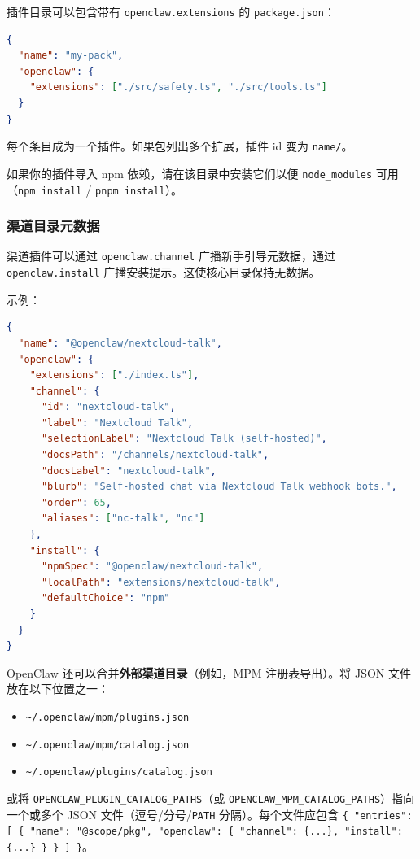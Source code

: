 插件目录可以包含带有 \texttt{openclaw.extensions} 的 \texttt{package.json}：

\begin{lstlisting}[language=json]
{
  "name": "my-pack",
  "openclaw": {
    "extensions": ["./src/safety.ts", "./src/tools.ts"]
  }
}
\end{lstlisting}


每个条目成为一个插件。如果包列出多个扩展，插件 id 变为 \texttt{name/}。

如果你的插件导入 npm 依赖，请在该目录中安装它们以便 \texttt{node\_modules} 可用（\texttt{npm install} / \texttt{pnpm install}）。

\subsubsection{渠道目录元数据}


渠道插件可以通过 \texttt{openclaw.channel} 广播新手引导元数据，通过 \texttt{openclaw.install} 广播安装提示。这使核心目录保持无数据。

示例：

\begin{lstlisting}[language=json]
{
  "name": "@openclaw/nextcloud-talk",
  "openclaw": {
    "extensions": ["./index.ts"],
    "channel": {
      "id": "nextcloud-talk",
      "label": "Nextcloud Talk",
      "selectionLabel": "Nextcloud Talk (self-hosted)",
      "docsPath": "/channels/nextcloud-talk",
      "docsLabel": "nextcloud-talk",
      "blurb": "Self-hosted chat via Nextcloud Talk webhook bots.",
      "order": 65,
      "aliases": ["nc-talk", "nc"]
    },
    "install": {
      "npmSpec": "@openclaw/nextcloud-talk",
      "localPath": "extensions/nextcloud-talk",
      "defaultChoice": "npm"
    }
  }
}
\end{lstlisting}


OpenClaw 还可以合并\textbf{外部渠道目录}（例如，MPM 注册表导出）。将 JSON 文件放在以下位置之一：

\begin{itemize}
  \item \texttt{\textasciitilde{}/.openclaw/mpm/plugins.json}
  \item \texttt{\textasciitilde{}/.openclaw/mpm/catalog.json}
  \item \texttt{\textasciitilde{}/.openclaw/plugins/catalog.json}
\end{itemize}


或将 \texttt{OPENCLAW\_PLUGIN\_CATALOG\_PATHS}（或 \texttt{OPENCLAW\_MPM\_CATALOG\_PATHS}）指向一个或多个 JSON 文件（逗号/分号/\texttt{PATH} 分隔）。每个文件应包含 \texttt{\{ "entries": [ \{ "name": "@scope/pkg", "openclaw": \{ "channel": \{...\}, "install": \{...\} \} \} ] \}}。

